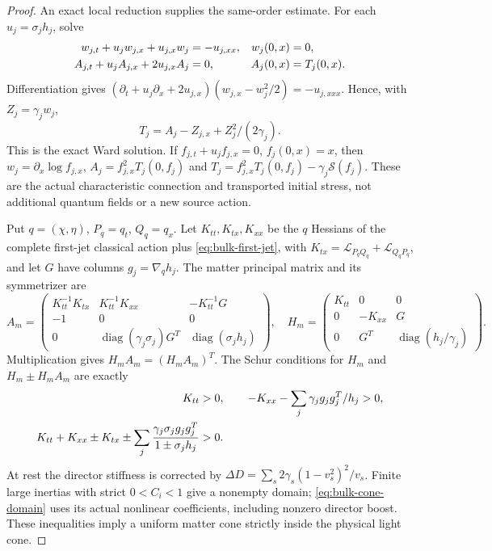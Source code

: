 \begin{proof}
An exact local reduction supplies the same-order estimate. For each
$u_j=\sigma_jh_j$, solve
\begin{align}
 w_{j,t}+u_jw_{j,x}+u_{j,x}w_j&=-u_{j,xx},
 &w_j(0,x)&=0,\notag\\
 A_{j,t}+u_jA_{j,x}+2u_{j,x}A_j&=0,
 &A_j(0,x)&=T_j(0,x).                                    \label{eq:bulk-local-transport}
\end{align}
Differentiation gives
$(\partial_t+u_j\partial_x+2u_{j,x})(w_{j,x}-w_j^2/2)
=-u_{j,xxx}$. Hence, with $Z_j=\gamma_jw_j$,
\begin{equation}
 T_j=A_j-Z_{j,x}+Z_j^2/(2\gamma_j).                       \label{eq:bulk-local-stress}
\end{equation}
This is the exact Ward solution. If
$f_{j,t}+u_jf_{j,x}=0$, $f_j(0,x)=x$, then
$w_j=\partial_x\log f_{j,x}$,
$A_j=f_{j,x}^2T_j(0,f_j)$ and
$T_j=f_{j,x}^2T_j(0,f_j)-\gamma_j\mathcal S(f_j)$.
These are the actual characteristic connection and transported initial
stress, not additional quantum fields or a new source action.

Put $q=(\chi,\eta)$, $P_q=q_t$, $Q_q=q_x$.
Let $K_{tt},K_{tx},K_{xx}$ be the $q$ Hessians of
the complete first-jet classical action plus \eqref{eq:bulk-first-jet},
with $K_{tx}=\mathcal L_{P_qQ_q}+\mathcal L_{Q_qP_q}$, and let
$G$ have columns $g_j=\nabla_qh_j$. The matter principal matrix and
its symmetrizer are
\begin{equation}
 A_m=\begin{pmatrix}
 K_{tt}^{-1}K_{tx}&K_{tt}^{-1}K_{xx}&-K_{tt}^{-1}G\\
 -1&0&0\\0&\operatorname{diag}(\gamma_j\sigma_j)G^T&
                 \operatorname{diag}(\sigma_jh_j)
 \end{pmatrix},\quad
 H_m=\begin{pmatrix}K_{tt}&0&0\\
 0&-K_{xx}&G\\0&G^T&\operatorname{diag}(h_j/\gamma_j)
 \end{pmatrix}.                                          \label{eq:bulk-symmetrizer}
\end{equation}
Multiplication gives $H_mA_m=(H_mA_m)^T$. The Schur conditions for
$H_m$ and $H_m\pm H_mA_m$ are exactly
\begin{align}
 K_{tt}&>0,\qquad
 -K_{xx}-\sum_j\gamma_jg_jg_j^T/h_j>0,\notag\\
 K_{tt}+K_{xx}\pm K_{tx}
       \pm\sum_j\frac{\gamma_j\sigma_jg_jg_j^T}
                              {1\pm\sigma_jh_j}&>0.       \label{eq:bulk-cone-domain}
\end{align}
At rest the director stiffness is corrected by
$\Delta D=\sum_s2\gamma_s(1-v_s^2)^2/v_s$.
Finite large inertias with strict $0<C_i<1$ give a nonempty domain;
\eqref{eq:bulk-cone-domain} uses its actual nonlinear coefficients,
including nonzero director boost. These inequalities imply a uniform
matter cone strictly inside the physical light cone.


\end{proof}
